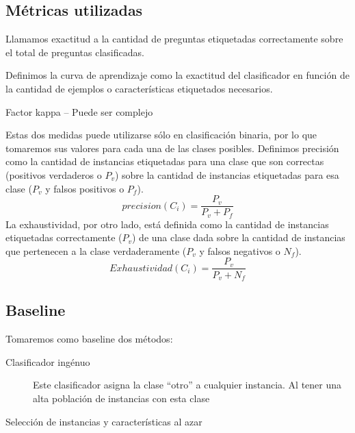 \subsection{Métricas utilizadas}
\begin{description}
    \item[Exactitud] Llamamos exactitud a la cantidad de preguntas etiquetadas correctamente sobre el total de preguntas clasificadas.
    \item[Curva de aprendizaje] Definimos la curva de aprendizaje como la exactitud del clasificador en función de la cantidad de ejemplos o características etiquetados necesarios.
    \item Factor kappa  -- Puede ser complejo
    \item [Precisión y exahustividad por clase] Estas dos medidas puede utilizarse sólo en clasificación binaria, por lo que tomaremos sus valores para cada una de las clases posibles. Definimos precisión como la cantidad de instancias etiquetadas para una clase que son correctas (positivos verdaderos o $P_v$) sobre la cantidad de instancias etiquetadas para esa clase ($P_v$ y falsos positivos o $P_f$).
    $$precision(C_i) = \frac{P_v}{P_v + P_f}$$
    La exhaustividad, por otro lado, está definida como la cantidad de instancias etiquetadas correctamente ($P_v$) de una clase dada sobre la cantidad de instancias que pertenecen a la clase verdaderamente ($P_v$ y falsos negativos o $N_f$).
    $$Exhaustividad(C_i) = \frac{P_v}{P_v + N_f}$$
\end{description}

\subsection{Baseline}
Tomaremos como baseline dos métodos:
\begin{description}
    \item[Clasificador ingénuo] Este clasificador asigna la clase ``otro'' a cualquier instancia. Al tener una alta población de instancias con esta clase
    \item[Selección de instancias y características al azar]
\end{description}


